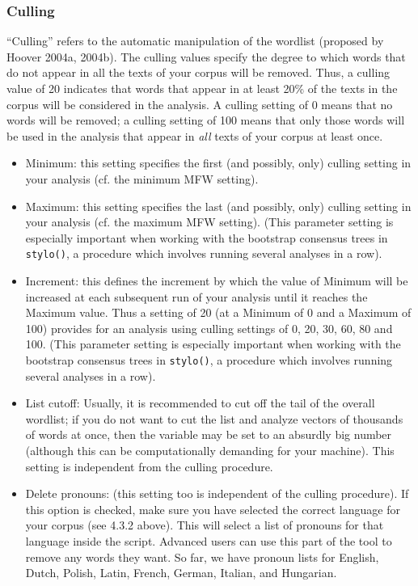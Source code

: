 \documentclass[11pt,a4paper]{article}
\def\margin#1{\marginpar{\textcolor{blue}{\footnotesize\tt #1}}}
\def\code#1{{\tt #1}}
\begin{document}
\subsubsection{Culling}

``Culling'' refers to the automatic manipulation of the wordlist (proposed
by Hoover 2004a, 2004b). The culling values specify the degree to
which words that do not appear in all the texts of your corpus will
be removed. Thus, a culling value of 20 indicates that words that
appear in at least 20\% of the texts in the corpus will be considered
in the analysis. A culling setting of 0 means that no words will be
removed; a culling setting of 100 means that only those words will
be used in the analysis that appear in \emph{all} texts of your corpus 
at least once.

\begin{itemize}
\item Minimum: this setting specifies the first (and possibly, only) culling
setting in your analysis (cf. the minimum MFW setting).\margin{culling.min=}\margin{<integer>} 

\item Maximum: this setting specifies the last (and possibly, only) culling
setting in your analysis (cf. the maximum MFW setting)\margin{culling.max=}\margin{<integer>}.
(This parameter setting is especially important when working with
the bootstrap consensus trees in \code{stylo()}, a procedure which
involves running several analyses in a row). 

\item Increment: this defines the increment by which the value of Minimum
will be increased at each subsequent run of your analysis until it
reaches the Maximum value. Thus a setting of 20 (at a Minimum of 0
and a Maximum of 100) provides for an analysis using culling settings
of 0, 20, 30, 60, 80 and 100\margin{culling.incr=}\margin{<integer>}.
(This parameter setting is especially important when working with
the bootstrap consensus trees in \code{stylo()}, a procedure which
involves running several analyses in a row). 

\item List cutoff: Usually, it is recommended to cut off the tail of the
overall wordlist\margin{mfw.list.cutoff=}\margin{<integer>};
if you do not want to cut the list and analyze vectors of thousands
of words at once, then the variable may be set to an absurdly big
number (although this can be computationally demanding for your machine).
This setting is independent from the culling procedure. 

\item Delete pronouns: (this setting too is independent of the culling 
procedure).\margin{delete.pronouns=}\margin{TRUE|FALSE}
If this option is checked, make sure you have selected the correct
language for your corpus (see 4.3.2 above). This will select a list
of pronouns for that language inside the 
script.\margin{corpus.lang=}\margin{"English"}\margin{"Dutch"}\margin{...}
Advanced users can use this part of the tool to remove any words they
want. So far, we have pronoun lists for English, Dutch, Polish, Latin,
French, German, Italian, and Hungarian. 
\end{itemize}
\end{document}
